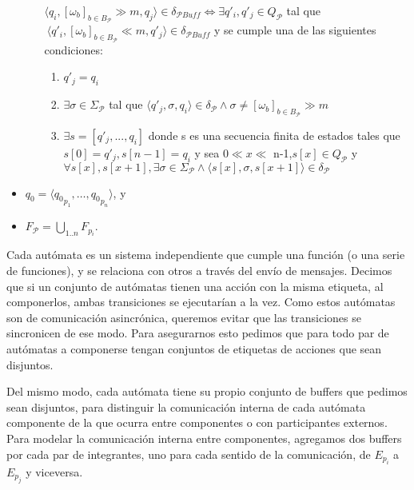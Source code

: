 \begin{definition}[Composición]
\begin{itemize}
\begin{enumerate}
$\langle q_i, [\omega_\mathit{b}]_{b \in B_\mathcal{P}} \gg m, q_j \rangle \in \delta_\mathit{\mathcal{P}Buff} \iff \exists q'_i, q'_j \in Q_\mathit{\mathcal{P}}$ tal que $\ \langle q'_i, [\omega_\mathit{b}]_{b \in B_\mathcal{P}} \ll m, q'_j \rangle \in \delta_\mathit{\mathcal{P}Buff}$ y se cumple una de las siguientes condiciones:
\begin{enumerate}
\item $q'_j = q_i$ 
\item $\exists \sigma \in \Sigma_\mathit{\mathcal{P}}$ tal que $\langle q'_j, \sigma, q_i \rangle \in \delta_\mathit{\mathcal{P}} \land \sigma \neq [\omega_\mathit{b}]_{b \in B_\mathcal{P}} \gg m $
\item $\exists s=[q'_j,...,q_i] $ donde s es una secuencia finita de estados tales que $s[0]= q'_j, s[n-1]=q_i$ y sea $ 0 \ll x \ll$ n-1,$s[x] \in Q_\mathit{\mathcal{P}}$ y $\forall s[x], s[x+1], \exists \sigma \in \Sigma_\mathit{\mathcal{P}} \land \langle s[x], \sigma, s[x+1] \rangle \in \delta_\mathit{\mathcal{P}} $  
\end{enumerate} 
\end{enumerate}
\item $q_0 = \langle {q_0}_{p_1}, \ldots, {q_0}_{p_n} \rangle$, y
\item $F_{\mathcal{P}} = \bigcup_{1..n} F_{p_i}$.
\end{itemize}

Cada autómata es un sistema independiente que cumple una función (o una serie de funciones), y se relaciona con otros a través del envío de mensajes. Decimos que si un conjunto de autómatas tienen una acción con la misma etiqueta, al componerlos, ambas transiciones se ejecutarían a la vez. Como estos autómatas son de comunicación asincrónica, queremos evitar que las transiciones se sincronicen de ese modo. Para asegurarnos esto pedimos que para todo par de autómatas a componerse tengan conjuntos de etiquetas de acciones que sean disjuntos. 

Del mismo modo, cada autómata tiene su propio conjunto de buffers que pedimos sean disjuntos, para distinguir la comunicación interna de cada autómata componente de la que ocurra entre componentes o con participantes externos. Para modelar la comunicación interna entre componentes, agregamos dos buffers por cada par de integrantes, uno para cada sentido de la comunicación, de $E_{p_i}$ a $E_{p_j}$ y viceversa.


\end{definition}
